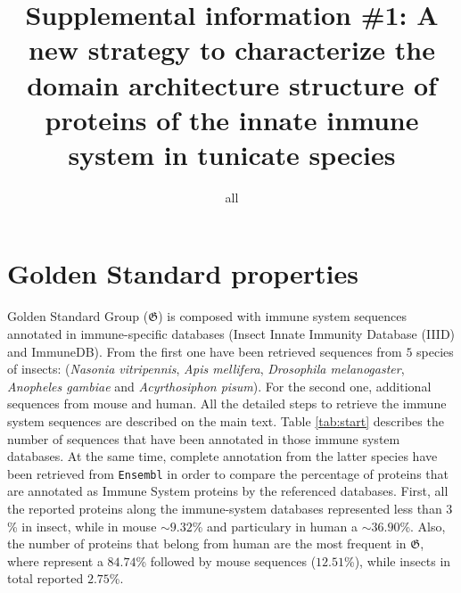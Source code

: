 \documentclass[12pt]{article}
\title{Supplemental information \#1: A new strategy to characterize the domain 
architecture structure of proteins of the innate inmune system in tunicate 
species}
\author{all}
\begin{document}
\maketitle


\section*{Golden Standard properties}

Golden Standard Group ($\boldsymbol{\mathfrak{G}}$) is composed with immune system sequences annotated in immune-specific databases (Insect Innate Immunity Database (IIID) and ImmuneDB). From the first one have been retrieved sequences from $5$ species of insects: (\textsl{Nasonia vitripennis}, \textsl{Apis mellifera}, \textsl{Drosophila melanogaster}, \textsl{Anopheles gambiae} and \textsl{Acyrthosiphon pisum}). For the second one,  additional sequences from mouse and human. All the detailed steps to retrieve the immune system sequences are described on the main text. Table \ref{tab:start} describes the number of sequences that have been annotated in those immune system databases. At the same time, complete annotation from the latter species have been retrieved from \texttt{Ensembl} in order to compare the percentage of proteins that are annotated as Immune System proteins by the referenced databases. 
First, all the reported proteins along the immune-system databases represented less than $3$\% in insect, while in mouse $\sim 9.32$\% and particulary in human a $\sim 36.90$\%. Also, the number of proteins that belong from human are the most frequent in $\boldsymbol{\mathfrak{G}}$, where represent a $84.74$\% followed by mouse sequences ($12.51$\%), while insects in total reported $2.75$\%.   
\end{document}

